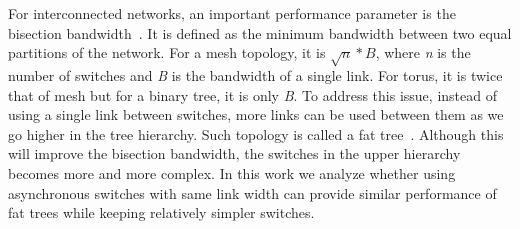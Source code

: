 
For interconnected networks, an important performance parameter is the bisection bandwidth~\cite{Wen-Chung2012}.
It is defined as the minimum bandwidth between two equal partitions of the network.
For a mesh topology, it is $\sqrt{n}*B$, where \emph{n} is the number of switches and \emph{B} is the bandwidth of a single link.
For torus, it is twice that of mesh but for a binary tree, it is only \emph{B}.
To address this issue, instead of using a single link between switches, more links can be used between them as we go higher in the tree hierarchy.
Such topology is called a fat tree~\cite{Leiserson1985,Ohring1995}. 
Although this will improve the bisection bandwidth, the switches in the upper hierarchy becomes more and more complex.
In this work we analyze whether using asynchronous switches with same link width can provide similar performance of fat trees while keeping relatively simpler switches.

